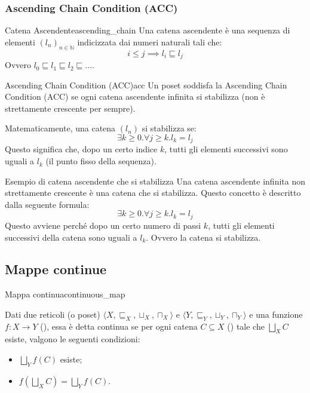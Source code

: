 \subsubsection{Ascending Chain Condition (ACC)}

\begin{definizione}{Catena Ascendente}{ascending_chain}
Una catena ascendente è una sequenza di elementi $(l_n)_{n \in \mathbb{N}}$
indicizzata dai numeri naturali tali che:
\[
i \le j \implies l_i \sqsubseteq l_j
\]
Ovvero $l_0 \sqsubseteq l_1 \sqsubseteq l_2 \sqsubseteq \dots$.
\end{definizione}

\begin{definizione}{Ascending Chain Condition (ACC)}{acc}
Un poset soddisfa la Ascending Chain Condition (ACC) se ogni catena ascendente
infinita si stabilizza (non è strettamente crescente per sempre).

Matematicamente, una catena $(l_n)$ si stabilizza se:
\[
\exists k \ge 0 . \forall j \ge k . l_k = l_j
\]
Questo significa che, dopo un certo indice $k$, tutti gli elementi successivi
sono uguali a $l_k$ (il punto fisso della sequenza).
\end{definizione}

\begin{esempio}{Esempio di catena ascendente che si stabilizza}{}
Una catena ascendente infinita non strettamente crescente è una catena che si stabilizza.
Questo concetto è descritto dalla seguente formula:
\[
 \exists k \ge 0 . \forall j \ge k . l_k = l_j
\]
Questo avviene perché dopo un certo numero di passi $k$, tutti gli elementi successivi
della catena sono uguali a $l_k$. Ovvero la catena si stabilizza.
\end{esempio}

\subsection{Mappe continue}

\begin{definizione}{Mappa continua}{continuous_map}

Dati due reticoli (o poset) $\langle X, \sqsubseteq_X, \sqcup_X, \sqcap_X \rangle$ e
$\langle Y, \sqsubseteq_Y, \sqcup_Y, \sqcap_Y \rangle$ e una funzione
$f: X \to Y$ (), essa è detta continua se per ogni catena
$C \subseteq X$ () tale che $\bigsqcup_X C$ esiste, valgono
le seguenti condizioni:
\begin{itemize}
    \item $\bigsqcup_Y f(C)$ esiste;
    \item $f(\bigsqcup_X C) = \bigsqcup_Y f(C)$.
\end{itemize}

\end{definizione}

